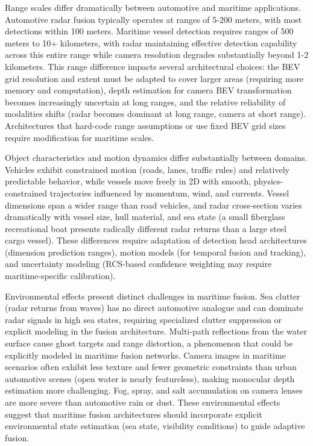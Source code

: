 Range scales differ dramatically between automotive and maritime applications. Automotive radar fusion typically operates at ranges of 5-200 meters, with most detections within 100 meters. Maritime vessel detection requires ranges of 500 meters to 10+ kilometers, with radar maintaining effective detection capability across this entire range while camera resolution degrades substantially beyond 1-2 kilometers. This range difference impacts several architectural choices: the BEV grid resolution and extent must be adapted to cover larger areas (requiring more memory and computation), depth estimation for camera BEV transformation becomes increasingly uncertain at long ranges, and the relative reliability of modalities shifts (radar becomes dominant at long range, camera at short range). Architectures that hard-code range assumptions or use fixed BEV grid sizes require modification for maritime scales.

Object characteristics and motion dynamics differ substantially between domains. Vehicles exhibit constrained motion (roads, lanes, traffic rules) and relatively predictable behavior, while vessels move freely in 2D with smooth, physics-constrained trajectories influenced by momentum, wind, and currents. Vessel dimensions span a wider range than road vehicles, and radar cross-section varies dramatically with vessel size, hull material, and sea state (a small fiberglass recreational boat presents radically different radar returns than a large steel cargo vessel). These differences require adaptation of detection head architectures (dimension prediction ranges), motion models (for temporal fusion and tracking), and uncertainty modeling (RCS-based confidence weighting may require maritime-specific calibration).

Environmental effects present distinct challenges in maritime fusion. Sea clutter (radar returns from waves) has no direct automotive analogue and can dominate radar signals in high sea states, requiring specialized clutter suppression or explicit modeling in the fusion architecture. Multi-path reflections from the water surface cause ghost targets and range distortion, a phenomenon that could be explicitly modeled in maritime fusion networks. Camera images in maritime scenarios often exhibit less texture and fewer geometric constraints than urban automotive scenes (open water is nearly featureless), making monocular depth estimation more challenging. Fog, spray, and salt accumulation on camera lenses are more severe than automotive rain or dust. These environmental effects suggest that maritime fusion architectures should incorporate explicit environmental state estimation (sea state, visibility conditions) to guide adaptive fusion.

